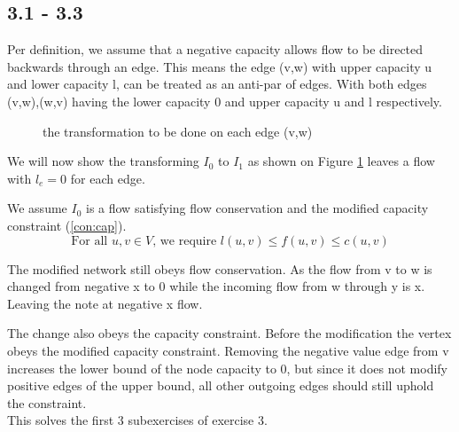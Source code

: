 \subsection*{3.1 - 3.3} 
Per definition, we assume that a negative capacity allows flow to be
directed backwards through an edge. This means the edge (v,w) with upper
capacity u and lower capacity l, can be treated as an anti-par of edges.
With both edges (v,w),(w,v) having the lower capacity 0 and upper capacity
u and l respectively.
\begin{figure}[!ht]
    \caption{the transformation to be done on each edge (v,w)}
    \label{fig:anti-transform}
\end{figure}
We will now show the transforming $I_0$ to $I_1$ as shown on Figure \ref{fig:anti-transform} leaves a flow with $l_e = 0$ for each edge.

We assume $I_0$ is a flow satisfying flow conservation and the modified capacity constraint (\ref{con:cap}).
\begin{equation} \label{con:cap}
    \text{For all } u, v \in V \text{, we require }l(u,v) \le f(u,v) \le c(u,v)
\end{equation}

The modified network still obeys flow conservation. As the flow from v to
w is changed from negative x to 0 while the incoming flow from w through y
is x. Leaving the note at negative x flow. 

The change also obeys the capacity constraint. Before the modification the
vertex obeys the modified capacity constraint. Removing the negative value
edge from v increases the lower bound of the node capacity to 0, but since
it does not modify positive edges of the upper bound, all other outgoing
edges should still uphold the constraint.\\ 
This solves the first 3 subexercises of exercise 3.
